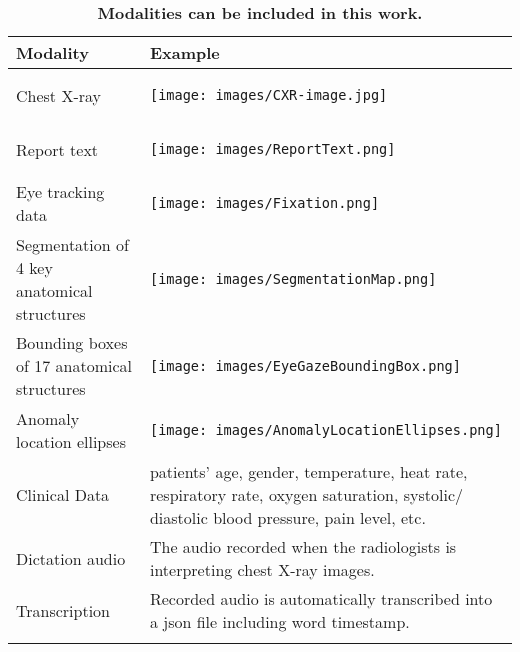 \begin{longtable}{|m{10em}|m{30em}|}
    \hline
    Modality                                                                           & Example                                                                                            \\ \hline
    Chest X-ray \citep{Johnson2019MIMIC_CXR} \citep{DJohnson2019MIMIC_CXR_JPG}         & \begin{center}\texttt{[image: images/CXR-image.jpg]}\end{center}               \\ \hline
    Report text \citep{Johnson2019MIMIC_CXR} \citep{DJohnson2019MIMIC_CXR_JPG}         & \begin{center}\texttt{[image: images/ReportText.png]}\end{center}              \\ \hline
    Eye tracking data \citep{Karargyris2020EyeGazeDataset} \citep{Lanfredi2021REFLACX} & \begin{center}\texttt{[image: images/Fixation.png]}\end{center}
    \\ \hline
    Segmentation of 4 key anatomical structures  \citep{Karargyris2020EyeGazeDataset}  & \begin{center}\texttt{[image: images/SegmentationMap.png]}\end{center}
    \\ \hline
    Bounding boxes of 17 anatomical structures  \citep{Karargyris2020EyeGazeDataset}   & \begin{center}\texttt{[image: images/EyeGazeBoundingBox.png]}\end{center}
    \\ \hline
    Anomaly location ellipses \citep{Lanfredi2021REFLACX}                              & \begin{center}\texttt{[image: images/AnomalyLocationEllipses.png]}\end{center}
    \\ \hline
    Clinical Data  \citep{Johnson2021MIMIC_IV} \citep{Johnson2021MIMIC_IV_ED}          &
    patients' age, gender, temperature, heat rate, respiratory rate, oxygen saturation, systolic/ diastolic blood pressure, pain level, etc.                                                \\ \hline
    Dictation audio \citep{Karargyris2020EyeGazeDataset}                               & The audio recorded when the radiologists is interpreting chest X-ray images.
    \\ \hline
    Transcription \citep{Karargyris2020EyeGazeDataset} \citep{Lanfredi2021REFLACX}     & Recorded audio is automatically transcribed into a json file including word timestamp.             \\ \hline
    \caption{\textbf{Modalities can be included in this work.}} %
    \label{tab:modalities_table}
\end{longtable}


